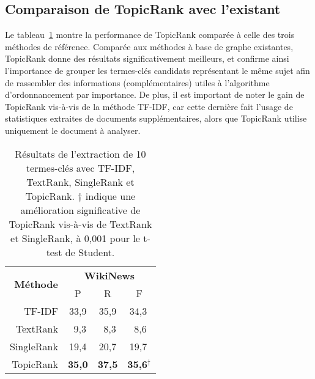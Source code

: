   \subsection{Comparaison de TopicRank avec l'existant}
  \label{subsec:comparaison_de_topicrank_avec_l_existant}
    Le tableau~\ref{tab:resultats_globaux} montre la performance de TopicRank
    comparée à celle des trois méthodes de référence.
    Comparée aux méthodes à base de graphe existantes, TopicRank donne des
    résultats significativement meilleurs, et confirme ainsi l'importance de
    grouper les termes-clés candidats représentant le même sujet afin de
    rassembler des informations (complémentaires) utiles à l'algorithme
    d'ordonnancement par importance. De plus, il est important de noter le gain
    de TopicRank vis-à-vis de la méthode TF-IDF, car cette dernière fait l'usage
    de statistiques extraites de documents supplémentaires, alors que TopicRank
    utilise uniquement le document à analyser. 
    \begin{table}
      \centering
      \begin{tabular}{rccc}
        \toprule
        \multirow{2}{*}[-2pt]{\textbf{Méthode}} & \multicolumn{3}{c}{\textbf{WikiNews}}\\
        \cmidrule(r){2-4}
        & P & R & F\\
        \midrule
        TF-IDF & 33,9 & 35,9 & 34,3$^{~}$\\
        TextRank & $~~$9,3 & $~~$8,3 & $~~$8,6$^{~}$\\
        SingleRank & 19,4 & 20,7 & 19,7$^{~}$\\
        TopicRank & \textbf{35,0} & \textbf{37,5} & \textbf{35,6}$^\dagger$\\
        \bottomrule
      \end{tabular}
      \caption{Résultats de l'extraction de 10 termes-clés avec TF-IDF,
               TextRank, SingleRank et TopicRank. $\dagger$ indique une
               amélioration significative de TopicRank vis-à-vis de TextRank et
               SingleRank, à 0,001 pour le t-test de Student.
               \label{tab:resultats_globaux}}
    \end{table}

